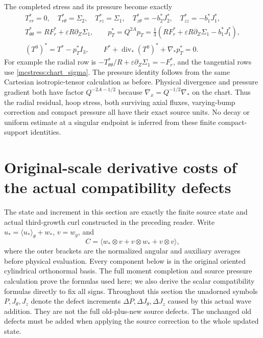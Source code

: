 The completed stress and its pressure become exactly
\begin{equation}\label{mcstress:chart_tensor}
\begin{gathered}
 T^*_{rr}=0,\quad T^*_{r\theta}=\Sigma_2,\quad
 T^*_{rz}=\Sigma_1,\quad T^*_{z\theta}=-b_2^*J_2^*,\quad
 T^*_{zz}=-b_1^*J_1^*,\\
 T^*_{\theta\theta}=RF_r^*+\varepsilon R\partial_Z\Sigma_1,
 \qquad
 p_T^*=Q^{2A}p_T
  =\tfrac13(RF_r^*+\varepsilon R\partial_Z\Sigma_1-b_1^*J_1^*),\\
 (T^0)^*=T^*-p_T^*I_3,\qquad
 F^*+\operatorname{div}_*(T^0)^*+\nabla_*p_T^*=0.
\end{gathered}
\end{equation}
For example the radial row is
$-T^*_{\theta\theta}/R+\varepsilon\partial_Z\Sigma_1=-F_r^*$,
and the tangential rows use \eqref{mcstress:chart_sigma}. The pressure
identity follows from the same Cartesian isotropic-tensor calculation
as before. Physical divergence and pressure gradient both have factor
$Q^{-2A-1/2}$ because $\nabla_x=Q^{-1/2}\nabla_*$ on the chart.
Thus the radial residual, hoop stress, both surviving axial fluxes,
varying-bump correction and compact pressure all have their exact
source units. No decay or uniform estimate at a singular endpoint is
inferred from these finite compact-support identities.


\section{Original-scale derivative costs of the actual compatibility defects}
\label{mcq:section}

The state and increment in this section are exactly the finite source state
and actual third-growth curl constructed in the preceding reader.
Write \(u_*=\langle u_*\rangle_\theta+w_*\), \(v=w_y\), and
\[
 C=\langle w_*\otimes v+v\otimes w_*+v\otimes v\rangle,
\]
where the outer brackets are the normalized angular and auxiliary
averages before physical evaluation. Every component below is in the
original oriented cylindrical orthonormal basis. The full moment
completion and source pressure calculation prove the formulas used here;
we also derive the scalar compatibility formulas directly to fix all signs.
Throughout this section the unadorned symbols \(P,J_\theta,J_z\)
denote the defect increments \(\Delta P,\Delta J_\theta,\Delta J_z\)
caused by this actual wave addition. They are not the full old-plus-new
source defects. The unchanged old defects must be added when applying
the source correction to the whole updated state.


